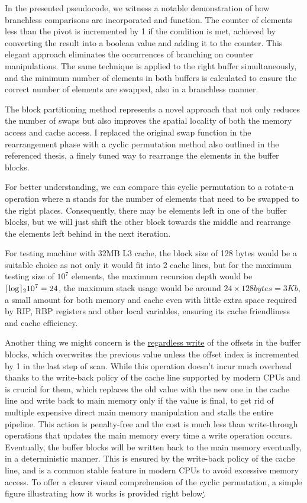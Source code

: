 \documentclass{article}
\DeclarePairedDelimiter\ceil{\lceil}{\rceil}
\begin{document}
In the presented pseudocode, we witness a notable demonstration of how branchless comparisons are incorporated and function. The counter of elements less than the pivot is incremented by 1 if the condition is met, achieved by converting the result into a boolean value and adding it to the counter. 
This elegant approach eliminates the occurrences of branching on counter manipulations. The same technique is applied to the right buffer simultaneously, and the minimum number of elements in both buffers is calculated to ensure the correct number of elements are swapped, also in a branchless manner.

The block partitioning method represents a novel approach that not only reduces the number of swaps but also improves the spatial locality of both the memory access and cache access.
I replaced the original swap function in the rearrangement phase with a cyclic permutation method also outlined in the referenced thesis, a finely tuned way to rearrange the elements in the buffer blocks.

For better understanding, we can compare this cyclic permutation to a rotate-n operation where n stands for the number of elements that need to be swapped to the right places.
Consequently, there may be elements left in one of the buffer blocks, but we will just shift the other block towards the middle and rearrange the elements left behind in the next iteration.

For testing machine with 32MB L3 cache, the block size of 128 bytes would be a suitable choice as not only it would fit into 2 cache lines, but for the maximum testing size of $10^7$ elements, the maximum recursion depth would be $\ceil\log_{2} 10^7 = 24$,
the maximum stack usage would be around $24 \times 128{bytes} = 3{Kb}$, a small amount for both memory and cache even with little extra space required by RIP, RBP registers and other local variables, ensuring its cache friendliness and cache efficiency.

Another thing we might concern is the \hyperlink{RegardlessWrite}{regardless write} of the offsets in the buffer blocks, which overwrites the previous value unless the offset index is incremented by 1 in the last step of scan.
While this operation doesn't incur much overhead thanks to the write-back policy of the cache line supported by modern CPUs and is crucial for them, which replaces the old value with the new one in the cache line and write back to main memory only if the value is final,
to get rid of multiple expensive direct main memory manipulation and stalls the entire pipeline. This action is penalty-free and the cost is much less than write-through operations that updates the main memory every time a write operation occurs.
Eventually, the buffer blocks will be written back to the main memory eventually, in a deterministic manner.
This is ensured by the write-back policy of the cache line, and is a common stable feature in modern CPUs to avoid excessive memory access.
To offer a clearer visual comprehension of the cyclic permutation, a simple figure illustrating how it works is provided right below\hyperlink{fig:cyclicpermu}{`}.
\end{document}
